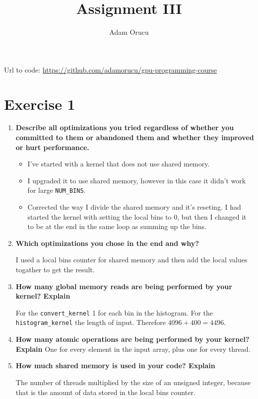 \documentclass[a4paper,11pt]{scrartcl}
\title{Assignment III}
\author{Adam Orucu}
\begin{document}
\maketitle

Url to code: \url{https://github.com/adamorucu/gpu-programming-course}

\section*{Exercise 1}

\begin{enumerate}
    \item \textbf{Describe all optimizations you tried regardless of whether you committed to them or abandoned them and whether they improved or hurt performance. }
    \begin{itemize}
        \item I've started with a kernel that does not use shared memory.
        \item I upgraded it to use shared memory, however in this case it didn't work for large \verb|NUM_BINS|.
        \item Corrected the way I divide the shared memory and it's reseting. I had started the kernel with setting the local bins to 0, but then I changed it to be at the end in the same loop as summing up the bins.
    \end{itemize}

    \item \textbf{Which optimizations you chose in the end and why? }

    I used a local bins counter for shared memory and then add the local values togather to get the result.

    \item \textbf{How many global memory reads are being performed by your kernel? Explain }

    For the \verb|convert_kernel| 1 for each bin in the histogram. For the \verb|histogram_kernel| the length of input. Therefore $4096 + 400 = 4496$.

    \item \textbf{How many atomic operations are being performed by your kernel? Explain}
    One for every element in the input array, plus one for every thread.

    \item \textbf{How much shared memory is used in your code? Explain}

    The number of threads multiplied by the size of an unsigned integer, because that is the amount of data stored in the local bins counter.


\end{enumerate}
\end{document}
